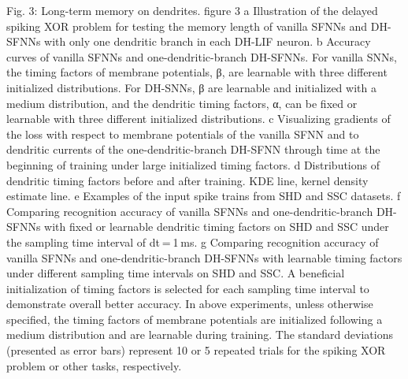 Fig. 3: Long-term memory on dendrites.
figure 3
a Illustration of the delayed spiking XOR problem for testing the memory length of vanilla SFNNs and DH-SFNNs with only one dendritic branch in each DH-LIF neuron. b Accuracy curves of vanilla SFNNs and one-dendritic-branch DH-SFNNs. For vanilla SNNs, the timing factors of membrane potentials, β, are learnable with three different initialized distributions. For DH-SNNs, β are learnable and initialized with a medium distribution, and the dendritic timing factors, α, can be fixed or learnable with three different initialized distributions. c Visualizing gradients of the loss with respect to membrane potentials of the vanilla SFNN and to dendritic currents of the one-dendritic-branch DH-SFNN through time at the beginning of training under large initialized timing factors. d Distributions of dendritic timing factors before and after training. KDE line, kernel density estimate line. e Examples of the input spike trains from SHD and SSC datasets. f Comparing recognition accuracy of vanilla SFNNs and one-dendritic-branch DH-SFNNs with fixed or learnable dendritic timing factors on SHD and SSC under the sampling time interval of dt = 1 ms. g Comparing recognition accuracy of vanilla SFNNs and one-dendritic-branch DH-SFNNs with learnable timing factors under different sampling time intervals on SHD and SSC. A beneficial initialization of timing factors is selected for each sampling time interval to demonstrate overall better accuracy. In above experiments, unless otherwise specified, the timing factors of membrane potentials are initialized following a medium distribution and are learnable during training. The standard deviations (presented as error bars) represent 10 or 5 repeated trials for the spiking XOR problem or other tasks, respectively.

